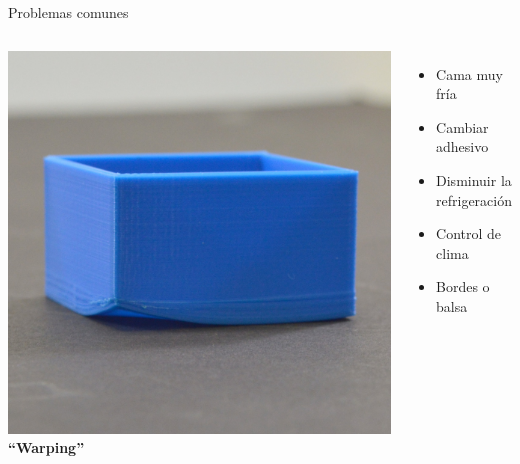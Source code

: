 \documentclass{beamer}
\begin{document}
	\begin{frame}{Problemas comunes}
		\begin{columns}
				\includegraphics[width=\textwidth]{images/Warping}
				\textbf{``Warping''}
				\begin{itemize}
					\item Cama muy fría
					\item Cambiar adhesivo
					\item Disminuir la refrigeración
					\item Control de clima
					\item Bordes o balsa
				\end{itemize}
		\end{columns}
	\end{frame}
	
\end{document}
